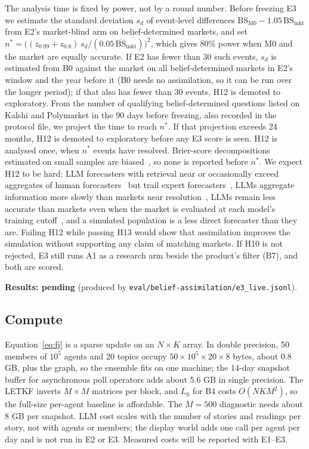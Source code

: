 \documentclass[10pt]{article}
\theoremstyle{remark}
\newcommand{\pending}[1]{\textbf{Results: pending} (produced by \nolinkurl{#1}).}
\begin{document}
The analysis time is fixed by power, not by a round number. Before freezing E3 we estimate the standard deviation $s_d$ of event-level differences $\mathrm{BS}_{\mathrm{M0}}-1.05\,\mathrm{BS}_{\mathrm{mkt}}$ from E2's market-blind arm on belief-determined markets, and set $n^\ast=\big((z_{0.99}+z_{0.8})\,s_d/(0.05\,\overline{\mathrm{BS}}_{\mathrm{mkt}})\big)^2$, which gives 80\% power when M0 and the market are equally accurate. If E2 has fewer than 30 such events, $s_d$ is estimated from B0 against the market on all belief-determined markets in E2's window and the year before it (B0 needs no assimilation, so it can be run over the longer period); if that also has fewer than 30 events, H12 is demoted to exploratory. From the number of qualifying belief-determined questions listed on Kalshi and Polymarket in the 90 days before freezing, also recorded in the protocol file, we project the time to reach $n^\ast$. If that projection exceeds 24 months, H12 is demoted to exploratory before any E3 score is seen. H12 is analysed once, when $n^\ast$ events have resolved. Brier-score decompositions estimated on small samples are biased~\cite{ferrofricker2012}, so none is reported before $n^\ast$. We expect H12 to be hard: LLM forecasters with retrieval near or occasionally exceed aggregates of human forecasters~\cite{halawi2024} but trail expert forecasters~\cite{karger2024}, LLMs aggregate information more slowly than markets near resolution~\cite{yang2025prophet}, LLMs remain less accurate than markets even when the market is evaluated at each model's training cutoff~\cite{douven2026}, and a simulated population is a less direct forecaster than they are. Failing H12 while passing H13 would show that assimilation improves the simulation without supporting any claim of matching markets. If H10 is not rejected, E3 still runs A1 as a research arm beside the product's filter (B7), and both are scored.

\pending{eval/belief-assimilation/e3_live.jsonl}

\subsection{Compute}
Equation~\eqref{eq:fj} is a sparse update on an $N\times K$ array. In double precision, 50 members of $10^5$ agents and 20 topics occupy $50\times10^5\times20\times8$ bytes, about $0.8$ GB, plus the graph, so the ensemble fits on one machine; the 14-day snapshot buffer for asynchronous poll operators adds about 5.6 GB in single precision. The LETKF inverts $M\times M$ matrices per block, and $L_0$ for B4 costs $O(NKM^2)$, so the full-size per-agent baseline is affordable. The $M=500$ diagnostic needs about 8 GB per snapshot. LLM cost scales with the number of stories and readings per story, not with agents or members; the display world adds one call per agent per day and is not run in E2 or E3. Measured costs will be reported with E1--E3.
\end{document}
